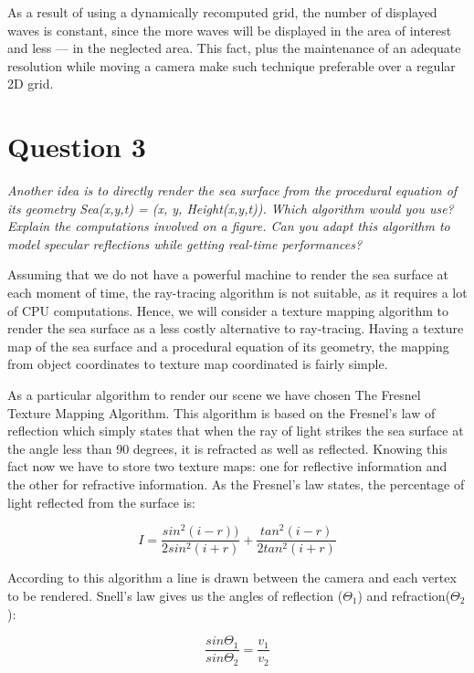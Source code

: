 \documentclass{report}
\begin{document}
As a result of using a dynamically recomputed grid, the number of
displayed waves is constant, since the more waves will be displayed in the
area of interest and less --- in the neglected area. This fact, plus the
maintenance of an adequate resolution while moving a camera make such
technique preferable over a regular 2D grid.

\section{Question 3}

\emph{Another idea is to directly render the sea surface from the
procedural equation of its geometry Sea(x,y,t) = (x, y, Height(x,y,t)).
Which algorithm would you use? Explain the computations involved on a
figure. Can you adapt this algorithm to model specular reflections while
getting real-time performances?}

Assuming that we do not have a powerful machine to render the sea
surface at each moment of time, the ray-tracing algorithm is not
suitable, as it requires a lot of CPU computations. Hence, we will
consider a texture mapping algorithm to render the sea surface as a less
costly alternative to ray-tracing. Having a texture map of the sea
surface and a procedural equation of its geometry, the mapping from
object coordinates to texture map coordinated is fairly simple. 

As a particular algorithm to render our scene we have chosen The Fresnel
Texture Mapping Algorithm. This algorithm is based on the Fresnel's law
of reflection which simply states that when the ray of light strikes the
sea surface at the angle less than 90 degrees, it is refracted as well
as reflected. Knowing this fact now we have to store two texture maps:
one for reflective information and the other for refractive information.
As the Fresnel's law states, the percentage of light reflected from the
surface is:

\begin{equation}
  I = \frac{sin^2(i-r))}{2sin^2(i+r)} + \frac{tan^2(i-r)}{2tan^2(i+r)}
\end{equation}

According to this algorithm a line is drawn between the camera and each
vertex to be rendered. Snell's law gives us the angles of
reflection ($\Theta_1$) and refraction($\Theta_2$): 

\begin{equation}
  \frac{sin\Theta_1}{sin\Theta_2} = \frac{v_1}{v_2}
\end{equation}
\end{document}
